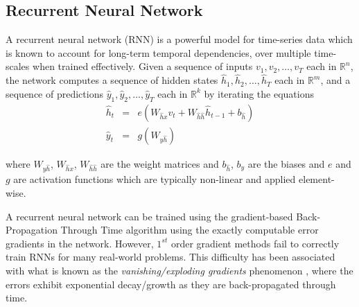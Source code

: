 	\subsection{Recurrent Neural Network}
	\label{subsec:rnn}
	A recurrent neural network (RNN) is a powerful model for time-series data which is known to account for long-term temporal dependencies, over multiple time-scales when trained effectively. 
	Given a sequence of inputs $v_1, v_2, \ldots, v_T$ each in $\mathbb{R}^n$, the network computes a sequence of hidden states $\hat{h}_1, \hat{h}_2, \ldots, \hat{h}_T$ each in $\mathbb{R}^m$, and a sequence of predictions $\hat{y}_1, \hat{y}_2, \ldots, \hat{y}_T$ each in $\mathbb{R}^k$ by iterating the equations
	\begin{eqnarray}
		\hat{h}_{t} & = & e(W_{\hat{h}x} v_t + W_{\hat{h}\hat{h}} \hat{h}_{t-1} + b_{\hat{h}}) \\
		\hat{y}_t & = & g(W_{y\hat{h}})
	\end{eqnarray}
	
	where $W_{y\hat{h}}$, $W_{\hat{h}x}$, $W_{\hat{h}\hat{h}}$ are the weight matrices and $b_{\hat{h}}$, $b_y$ are the biases and $e$ and $g$ are activation functions which are typically non-linear and applied element-wise. %
	
	A recurrent neural network can be trained using the gradient-based Back-Propagation Through Time algorithm \cite{Werbos1990} using the exactly computable error gradients in the network. However, $1^{st}$ order gradient methods fail to correctly train RNNs for many real-world problems. This difficulty has been associated with what is known as the \textit{vanishing/exploding gradients} phenomenon \cite{Bengio1994}, where the errors exhibit exponential decay/growth as they are back-propagated through time. %

